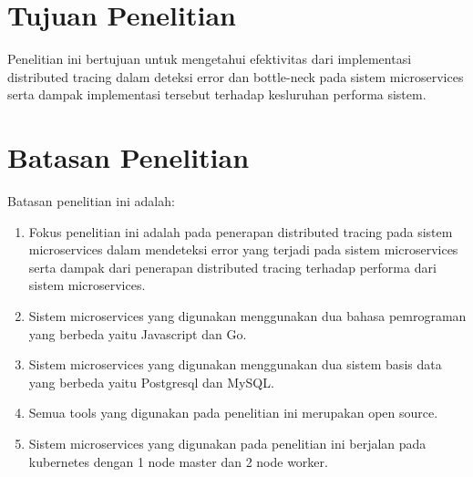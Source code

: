\section{Tujuan Penelitian}
Penelitian ini bertujuan untuk mengetahui efektivitas dari implementasi distributed tracing dalam deteksi error dan bottle-neck pada sistem microservices serta dampak implementasi tersebut terhadap kesluruhan performa sistem.

\section{Batasan Penelitian}
Batasan penelitian ini adalah:
\begin{enumerate}
\item Fokus penelitian ini adalah pada penerapan distributed tracing pada sistem microservices dalam mendeteksi error yang terjadi pada sistem microservices serta dampak dari penerapan distributed tracing terhadap performa dari sistem microservices.
\item Sistem microservices yang digunakan menggunakan dua bahasa pemrograman yang berbeda yaitu Javascript dan Go.
\item Sistem microservices yang digunakan menggunakan dua sistem basis data yang berbeda yaitu Postgresql dan MySQL.
\item Semua tools yang digunakan pada penelitian ini merupakan open source.
\item Sistem microservices yang digunakan pada penelitian ini berjalan pada kubernetes dengan 1 node master dan 2 node worker.
\end{enumerate}


